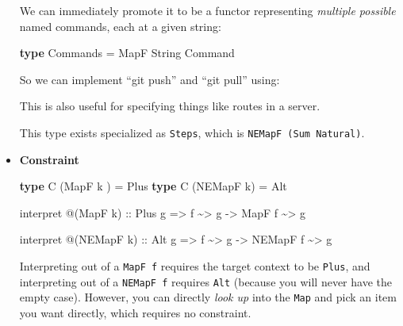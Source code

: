 \documentclass[]{article}
\newenvironment{Shaded}{}{}
\newcommand{\DataTypeTok}[1]{\textcolor[rgb]{0.56,0.13,0.00}{#1}}
\newcommand{\KeywordTok}[1]{\textcolor[rgb]{0.00,0.44,0.13}{\textbf{#1}}}
\newcommand{\NormalTok}[1]{#1}
\newcommand{\OperatorTok}[1]{\textcolor[rgb]{0.40,0.40,0.40}{#1}}
\newcommand{\OtherTok}[1]{\textcolor[rgb]{0.00,0.44,0.13}{#1}}
\newcommand{\StringTok}[1]{\textcolor[rgb]{0.25,0.44,0.63}{#1}}
\begin{document}
\begin{itemize}
  We can immediately promote it to be a functor representing \emph{multiple
  possible} named commands, each at a given string:

\begin{Shaded}
\begin{Highlighting}[]
\KeywordTok{type} \DataTypeTok{Commands} \OtherTok{=} \DataTypeTok{MapF} \DataTypeTok{String} \DataTypeTok{Command}
\end{Highlighting}
\end{Shaded}

  So we can implement ``git push'' and ``git pull'' using:

\begin{Shaded}
\end{Shaded}

  This is also useful for specifying things like routes in a server.

  This type exists specialized as \texttt{Steps}, which is
  \texttt{NEMapF\ (Sum\ Natural)}.
\item
  \textbf{Constraint}

\begin{Shaded}
\begin{Highlighting}[]
\KeywordTok{type} \DataTypeTok{C}\NormalTok{ (}\DataTypeTok{MapF}\NormalTok{ k  ) }\OtherTok{=} \DataTypeTok{Plus}
\KeywordTok{type} \DataTypeTok{C}\NormalTok{ (}\DataTypeTok{NEMapF}\NormalTok{ k) }\OtherTok{=} \DataTypeTok{Alt}

\NormalTok{interpret }\OperatorTok{@}\NormalTok{(}\DataTypeTok{MapF}\NormalTok{ k)}
\OtherTok{    ::} \DataTypeTok{Plus}\NormalTok{ g}
    \OtherTok{=>}\NormalTok{ f }\OperatorTok{\textasciitilde{}>}\NormalTok{ g}
    \OtherTok{{-}>} \DataTypeTok{MapF}\NormalTok{ f }\OperatorTok{\textasciitilde{}>}\NormalTok{ g}

\NormalTok{interpret }\OperatorTok{@}\NormalTok{(}\DataTypeTok{NEMapF}\NormalTok{ k)}
\OtherTok{    ::} \DataTypeTok{Alt}\NormalTok{ g}
    \OtherTok{=>}\NormalTok{ f }\OperatorTok{\textasciitilde{}>}\NormalTok{ g}
    \OtherTok{{-}>} \DataTypeTok{NEMapF}\NormalTok{ f }\OperatorTok{\textasciitilde{}>}\NormalTok{ g}
\end{Highlighting}
\end{Shaded}

  Interpreting out of a \texttt{MapF\ f} requires the target context to be
  \texttt{Plus}, and interpreting out of a \texttt{NEMapF\ f} requires
  \texttt{Alt} (because you will never have the empty case). However, you can
  directly \emph{look up} into the \texttt{Map} and pick an item you want
  directly, which requires no constraint.
\end{itemize}
\end{document}
